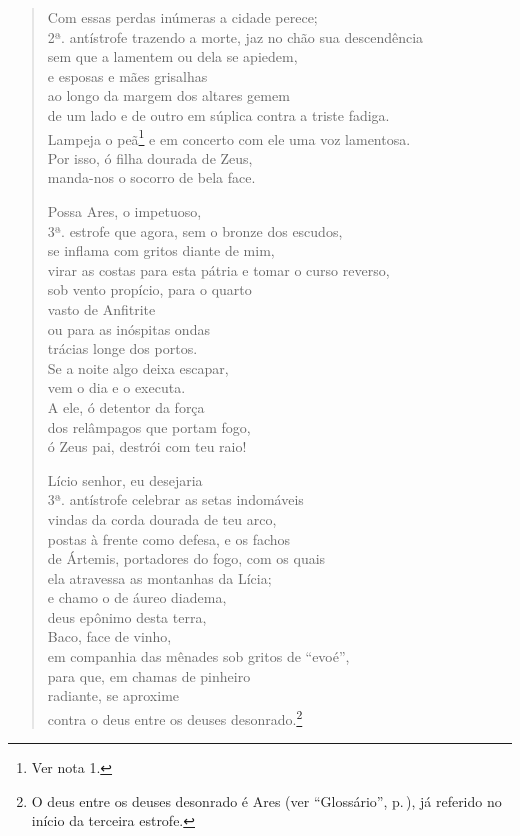 \begin{verse}
Com essas perdas inúmeras a cidade perece;\\ 2ª. antístrofe
trazendo a morte, jaz no chão sua descendência \\
sem que a lamentem ou dela se apiedem,\\
e esposas e mães grisalhas\\
ao longo da margem dos altares gemem\\
de um lado e de outro em súplica contra a triste fadiga.\\
Lampeja o peã\footnote{Ver nota 1.} %
e em concerto com ele uma voz lamentosa.\\
Por isso, ó filha dourada de Zeus,\\
manda-nos o socorro de bela face.

Possa Ares, o impetuoso,\\ 3ª. estrofe 
que agora, sem o bronze dos escudos,\\
se inflama com gritos diante de mim,\\
virar as costas para esta pátria e tomar o curso reverso,\\
sob vento propício, para o quarto\\
vasto de Anfitrite\\
ou para as inóspitas ondas\\
trácias longe dos portos.\\
Se a noite algo deixa escapar,\\
vem o dia e o executa.\\
A ele, ó detentor da força \\
dos relâmpagos que portam fogo,\\
ó Zeus pai, destrói com teu raio!

Lício senhor, eu desejaria\\ 3ª. antístrofe
celebrar as setas indomáveis\\
vindas da corda dourada de teu arco,\\
postas à frente como defesa, e os fachos\\
de Ártemis, portadores do fogo, com os quais\\
ela atravessa as montanhas da Lícia;\\
e chamo o de áureo diadema,\\
deus epônimo desta terra, \\
Baco, face de vinho,\\
em companhia das mênades sob gritos de ``evoé'',\\
para que, em chamas de pinheiro\\
radiante, se aproxime\\
contra o deus entre os deuses desonrado.\footnote{O deus entre os deuses desonrado é Ares (ver ``Glossário'', p.\,\pageref{glossario}), já referido no início da terceira estrofe.}
\end{verse}


